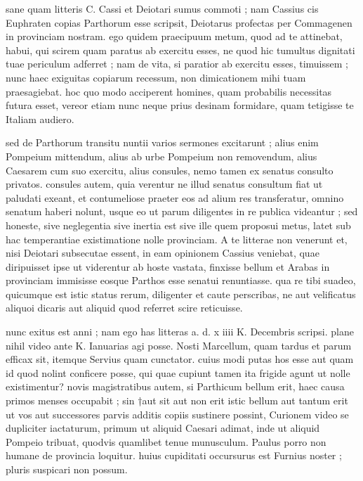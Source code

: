 


 sane quam litteris C. Cassi et Deiotari sumus commoti ; nam Cassius cis Euphraten copias Parthorum esse scripsit, Deiotarus profectas per Commagenen in provinciam nostram. ego quidem praecipuum metum, quod ad te attinebat, habui, qui scirem quam paratus ab exercitu esses, ne quod hic tumultus dignitati tuae periculum adferret ; nam de vita, si paratior ab exercitu esses, timuissem ; nunc haec exiguitas copiarum recessum, non dimicationem mihi tuam praesagiebat. hoc quo modo acciperent homines, quam probabilis necessitas futura esset, vereor etiam nunc neque prius desinam formidare, quam tetigisse te Italiam audiero.

 sed de Parthorum transitu nuntii varios sermones excitarunt ; alius enim Pompeium mittendum, alius ab urbe Pompeium non removendum, alius Caesarem cum suo exercitu, alius consules, nemo tamen ex senatus consulto privatos. consules autem, quia verentur ne illud senatus consultum fiat ut paludati exeant, et contumeliose praeter eos ad alium res transferatur, omnino senatum haberi nolunt, usque eo ut parum diligentes in re publica videantur ; sed honeste, sive neglegentia sive inertia est sive ille quem proposui metus, latet sub hac temperantiae existimatione nolle provinciam. A te litterae non venerunt et, nisi Deiotari subsecutae essent, in eam opinionem Cassius veniebat, quae diripuisset ipse ut viderentur ab hoste vastata, finxisse bellum et Arabas in provinciam immisisse eosque Parthos esse senatui renuntiasse. qua re tibi suadeo, quicumque est istic status rerum, diligenter et caute perscribas, ne aut velificatus aliquoi dicaris aut aliquid quod referret scire reticuisse.

 nunc exitus est anni ; nam ego has litteras a. d. x iiii K. Decembris scripsi. plane nihil video ante K. Ianuarias agi posse. Nosti Marcellum, quam tardus et parum efficax sit, itemque Servius quam cunctator. cuius modi putas hos esse aut quam id quod nolint conficere posse, qui quae cupiunt tamen ita frigide agunt ut nolle existimentur? novis magistratibus autem, si Parthicum bellum erit, haec causa primos menses occupabit ; sin †aut sit aut non erit istic bellum aut tantum erit ut vos aut successores parvis additis copiis sustinere possint, Curionem video se dupliciter iactaturum, primum ut aliquid Caesari adimat, inde ut aliquid Pompeio tribuat, quodvis quamlibet tenue munusculum. Paulus porro non humane de provincia loquitur. huius cupiditati occursurus est Furnius noster ; pluris suspicari non possum.

